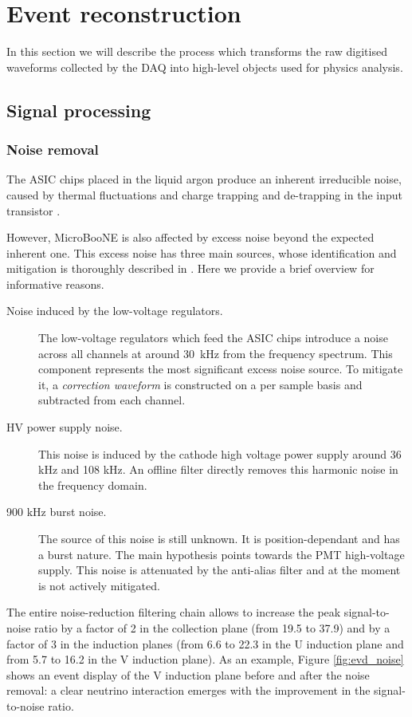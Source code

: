 \chapter{Event reconstruction}\label{sec:eventreco}

\minitoc

In this section we will describe the process which transforms the raw digitised waveforms collected by the DAQ into high-level objects used for physics analysis. 

\section{Signal processing}
\subsection{Noise removal}
The ASIC chips placed in the liquid argon produce an inherent irreducible noise, caused by thermal fluctuations and charge trapping and de-trapping in the input transistor \cite{Acciarri:2017sde}. 

However, MicroBooNE is also affected by excess noise beyond the expected inherent one. This excess noise has three main sources, whose identification and mitigation is thoroughly described in \cite{Acciarri:2017sde}. Here we provide a brief overview for informative reasons.
\begin{description}
\item[Noise induced by the low-voltage regulators.] The low-voltage regulators which feed the ASIC chips introduce a noise across all channels at around 30~kHz from the frequency spectrum. This component represents the most significant excess noise source. To mitigate it, a \emph{correction waveform} is constructed on a per sample basis and subtracted from each channel.
\item[HV power supply noise.] This noise is induced by the cathode high voltage power supply around 36 kHz and 108 kHz. An offline filter directly removes this harmonic noise in the frequency domain.
\item[900 kHz burst noise.] The source of this noise is still unknown. It is position-dependant and has a burst nature. The main hypothesis points towards the PMT high-voltage supply. This noise is attenuated by the anti-alias filter and at the moment is not actively mitigated.
\end{description}
The entire noise-reduction filtering chain allows to increase the peak signal-to-noise ratio by a factor of 2 in the collection plane (from 19.5 to 37.9) and by a factor of 3 in the induction planes (from 6.6 to 22.3 in the U induction plane and from 5.7 to 16.2 in the V induction plane). As an example, Figure \ref{fig:evd_noise} shows an event display of the V induction plane before and after the noise removal: a clear neutrino interaction emerges with the improvement in the signal-to-noise ratio. 

